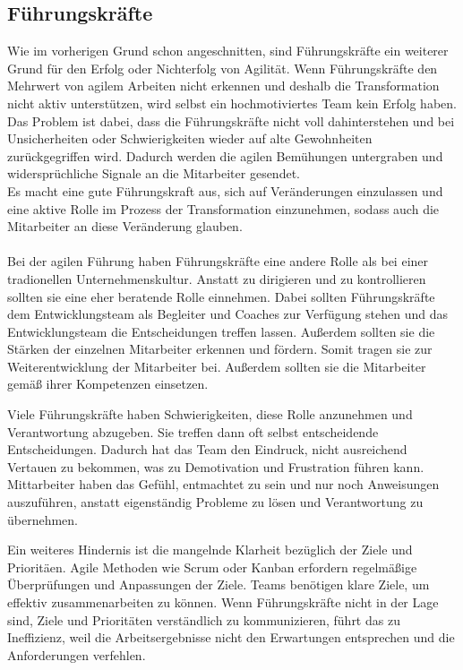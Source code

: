 \documentclass[ngerman]{seminarvorlage}
\begin{document}
\subsection{Führungskräfte}
Wie im vorherigen Grund schon angeschnitten, sind Führungskräfte ein weiterer Grund für den Erfolg oder Nichterfolg von Agilität. Wenn Führungskräfte den Mehrwert von agilem Arbeiten nicht erkennen und deshalb die Transformation nicht aktiv unterstützen, wird selbst ein hochmotiviertes Team kein Erfolg haben. Das Problem ist dabei, dass die Führungskräfte nicht voll dahinterstehen und bei Unsicherheiten oder Schwierigkeiten wieder auf alte Gewohnheiten zurückgegriffen wird. Dadurch werden die agilen Bemühungen untergraben und widersprüchliche Signale an die Mitarbeiter gesendet.\\
Es macht eine gute Führungskraft aus, sich auf Veränderungen einzulassen und eine aktive Rolle im Prozess der Transformation einzunehmen, sodass auch die Mitarbeiter an diese Veränderung glauben.\\\\
Bei der agilen Führung haben Führungskräfte eine andere Rolle als bei einer tradionellen Unternehmenskultur. Anstatt zu dirigieren und zu kontrollieren sollten sie eine eher beratende Rolle einnehmen. Dabei sollten Führungskräfte dem Entwicklungsteam als Begleiter und Coaches zur Verfügung stehen und das Entwicklungsteam die Entscheidungen treffen lassen. Außerdem sollten sie die Stärken der einzelnen Mitarbeiter erkennen und fördern. Somit tragen sie zur Weiterentwicklung der Mitarbeiter bei. Außerdem sollten sie die Mitarbeiter gemäß ihrer Kompetenzen einsetzen.\cite{cleverlance.2024}

Viele Führungskräfte haben Schwierigkeiten, diese Rolle anzunehmen und Verantwortung abzugeben. Sie treffen dann oft selbst entscheidende Entscheidungen. Dadurch hat das Team den Eindruck, nicht ausreichend Vertauen zu bekommen, was zu Demotivation und Frustration führen kann. Mittarbeiter haben das Gefühl, entmachtet zu sein und nur noch Anweisungen auszuführen, anstatt eigenständig Probleme zu lösen und Verantwortung zu übernehmen.

Ein weiteres Hindernis ist die mangelnde Klarheit bezüglich der Ziele und Prioritäen. Agile Methoden wie Scrum oder Kanban erfordern regelmäßige Überprüfungen und Anpassungen der Ziele. Teams benötigen klare Ziele, um effektiv zusammenarbeiten zu können. Wenn Führungskräfte nicht in der Lage sind, Ziele und Prioritäten verständlich zu kommunizieren, führt das zu Ineffizienz, weil die Arbeitsergebnisse nicht den Erwartungen entsprechen und die Anforderungen verfehlen.
\end{document}
